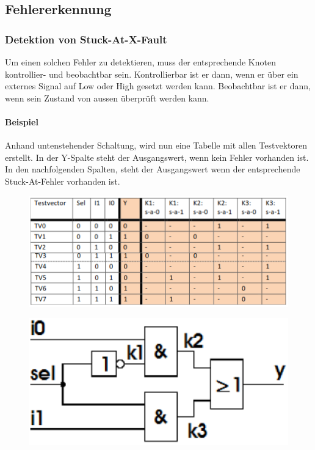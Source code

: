 \subsection{Fehlererkennung}
\subsubsection{Detektion von Stuck-At-X-Fault}
Um einen solchen Fehler zu detektieren, muss der entsprechende Knoten kontrollier- und beobachtbar sein. Kontrollierbar ist er dann, wenn er über ein externes Signal auf Low oder High gesetzt werden kann. Beobachtbar ist er dann, wenn sein Zustand von aussen überprüft werden kann.
\paragraph{Beispiel}
Anhand untenstehender Schaltung, wird nun eine Tabelle mit allen Testvektoren erstellt. In der Y-Spalte steht der Ausgangswert, wenn kein Fehler vorhanden ist. In den nachfolgenden Spalten, steht der Ausgangswert wenn der entsprechende Stuck-At-Fehler vorhanden ist.\ \\
\begin{minipage}{0.6\textwidth}
\begin{figure}[H]
    \includegraphics[width=1.0\textwidth]{images/stuckat_detektion_1.png}
\end{figure}
\end{minipage}
\hfill
\begin{minipage}{0.35\textwidth}
\begin{figure}[H]
    \includegraphics[width=1.0\textwidth]{images/stuckat_detektion_schaltung.png}
\end{figure}
\end{minipage} \\
